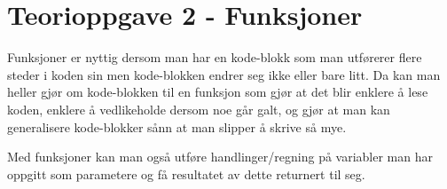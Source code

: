 \documentclass[10pt,a4paper]{article}
\begin{document}
\medskip
\section*{Teorioppgave 2 - Funksjoner}
Funksjoner er nyttig dersom man har en kode-blokk som man utførerer flere steder i koden sin men kode-blokken endrer seg ikke eller bare litt.  Da kan man heller gjør om kode-blokken til en funksjon som gjør at det blir enklere å lese koden,  enklere å vedlikeholde dersom noe går galt,  og gjør at man kan generalisere kode-blokker sånn at man slipper å skrive så mye.

\medskip
Med funksjoner kan man også utføre handlinger/regning på variabler man har oppgitt som parametere og få resultatet av dette returnert til seg. 
\end{document}
